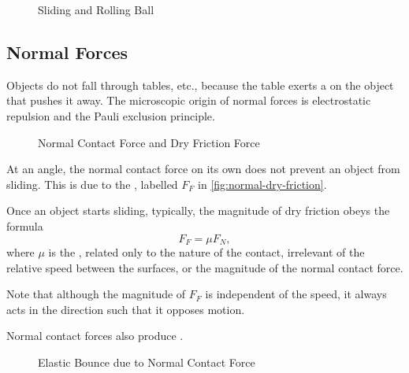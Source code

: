 \begin{figure}[ht!]
    \centering

    \caption{Sliding and Rolling Ball}
    \label{fig:sliding-rolling-ball}%
\end{figure}

\subsection{Normal Forces}

Objects do not fall through tables, etc., because the table exerts a  on the object that pushes it away. The microscopic origin of normal forces is electrostatic repulsion and the Pauli exclusion principle.

\begin{figure}[ht!]
    \centering

    \caption{Normal Contact Force and Dry Friction Force}
    \label{fig:normal-dry-friction}
\end{figure}

At an angle, the normal contact force on its own does not prevent an object from sliding. This is due to the , labelled \(F_F\) in \autoref{fig:normal-dry-friction}.

\begin{theorem}
    \label{thm:coefficient-of-friction}%
    Once an object starts sliding, typically, the magnitude of dry friction obeys the formula
    \begin{equation}
        F_F = \mu F_N,
    \end{equation}
    where \(\mu\) is the , related only to the nature of the contact, irrelevant of the relative speed between the surfaces, or the magnitude of the normal contact force.
\end{theorem}

Note that although the magnitude of \(F_F\) is independent of the speed, it always acts in the direction such that it opposes motion.

Normal contact forces also produce .

\begin{figure}[ht!]
    \centering

    \caption{Elastic Bounce due to Normal Contact Force}
    \label{fig:elastic-bounce-normal-contact}
\end{figure}

